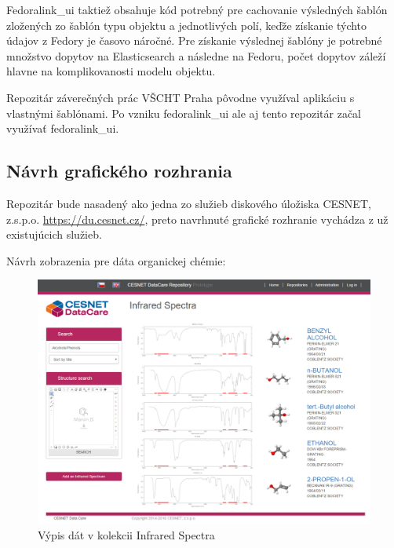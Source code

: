 \documentclass[thesis=M,slovak]{FITthesis}[2013/05/06]
\begin{document}
Fedoralink\_ui taktiež obsahuje kód potrebný pre cachovanie výsledných šablón zložených zo šablón typu objektu a jednotlivých polí, keďže získanie týchto údajov z Fedory je časovo náročné. Pre získanie výslednej šablóny je potrebné množstvo dopytov na Elasticsearch a následne na Fedoru, počet dopytov záleží hlavne na komplikovanosti modelu objektu.

Repozitár záverečných prác VŠCHT Praha pôvodne využíval aplikáciu s vlastnými šablónami. Po vzniku fedoralink\_ui ale aj tento repozitár začal využívať fedoralink\_ui.

\subsection{Návrh grafického rozhrania}
Repozitár bude nasadený ako jedna zo služieb diskového úložiska CESNET, z.s.p.o. \url{https://du.cesnet.cz/}, preto navrhnuté grafické rozhranie vychádza z už existujúcich služieb.

Návrh zobrazenia pre dáta organickej chémie:
\begin{figure}\centering
	\includegraphics[width=1.0\textwidth]{grafika/list_InfraredSpectra.png}
 	\caption[Výpis dát v kolekcii InfraredSpectra]{Výpis dát v kolekcii Infrared Spectra}\label{graphics:listInfrared}
\end{figure}
\end{document}
